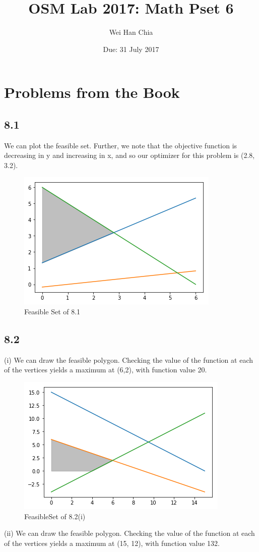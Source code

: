 \documentclass{article}
\begin{document}
	\title{OSM Lab 2017: Math Pset 6}
	\author{Wei Han Chia}
	\date{Due: 31 July 2017}
	\maketitle
	
	\section*{Problems from the Book}
	\subsection*{8.1}
	We can plot the feasible set. Further, we note that the objective function is decreasing in y and increasing in x, and so our optimizer for this problem is (2.8, 3.2).
	
	\begin{figure}[!h]
		\centering
		\includegraphics[scale = 0.5]{fig1}
		\caption{Feasible Set of 8.1}
	\end{figure}
	
	\subsection*{8.2}
	(i) We can draw the feasible polygon. Checking the value of the function at each of the vertices yields a maximum at (6,2), with function value 20.
	
	\begin{figure}[!h]
		\centering
		\includegraphics[scale = 0.5]{fig2}
		\caption{FeasibleSet of 8.2(i)}
	\end{figure}
	\newpage
	(ii) We can draw the feasible polygon. Checking the value of the function at each of the vertices yields a maximum at (15, 12), with function value 132.
	
\end{document}

